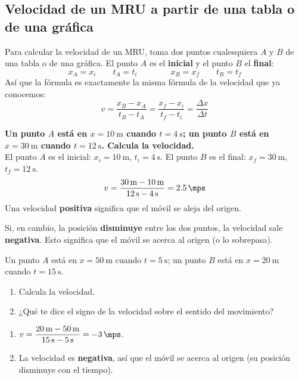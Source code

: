 \subsection{Velocidad de un MRU a partir de una tabla o de una gráfica}

Para calcular la velocidad de un MRU, toma dos puntos cualesquiera \(A\) y \(B\) de una tabla o de una gráfica. El punto \(A\) es el \textbf{inicial} y el punto \(B\) el \textbf{final}:
\begin{equation*}
    x_A = x_i \qquad t_A = t_i \qquad\qquad x_B = x_f \qquad t_B = t_f
\end{equation*}
Así que la fórmula es exactamente la misma fórmula de la velocidad que ya conocemos:
\begin{equation*}
    v = \dfrac{x_B - x_A}{t_B - t_A} = \dfrac{x_f - x_i}{t_f - t_i} = \dfrac{\Delta x}{\Delta t}
\end{equation*}

\begin{example}
    \textbf{Un punto \(A\) está en \(x = \qty{10}{\m}\) cuando \(t = \qty{4}{\s}\); un punto \(B\) está en \(x = \qty{30}{\m}\) cuando \(t = \qty{12}{\s}\). Calcula la velocidad.} \\
    El punto \(A\) es el inicial: \(x_i = \qty{10}{\m}\), \(t_i = \qty{4}{\s}\). El punto \(B\) es el final: \(x_f = \qty{30}{\m}\), \(t_f = \qty{12}{\s}\).
    \begin{equation*}
        v = \dfrac{\qty{30}{\m} - \qty{10}{\m}}{\qty{12}{\s} - \qty{4}{\s}} = \qty{2.5}{\mps}
    \end{equation*}
    Una velocidad \textbf{positiva} significa que el móvil se aleja del origen.
\end{example}

\begin{impt}
    Si, en cambio, la posición \textbf{disminuye} entre los dos puntos, la velocidad sale \textbf{negativa}. Esto significa que el móvil se acerca al origen (o lo sobrepasa).
\end{impt}

\begin{exercise}
    Un punto \(A\) está en \(x = \qty{50}{\m}\) cuando \(t = \qty{5}{\s}\); un punto \(B\) está en \(x = \qty{20}{\m}\) cuando \(t = \qty{15}{\s}\).
    \begin{enumerate}[label=\letraminuscula]
        \item Calcula la velocidad.
        \item ¿Qué te dice el signo de la velocidad sobre el sentido del movimiento?
    \end{enumerate}
    \begin{solu}
        \begin{enumerate}[label=\alph*)]
            \item \(v = \dfrac{\qty{20}{\m} - \qty{50}{\m}}{\qty{15}{\s} - \qty{5}{\s}} = \qty{-3}{\mps}\).
            \item La velocidad es \textbf{negativa}, así que el móvil se acerca al origen (su posición disminuye con el tiempo).
        \end{enumerate}
    \end{solu}
\end{exercise}

